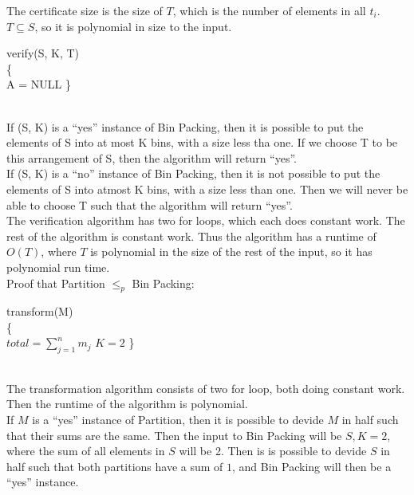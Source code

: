 \documentclass{assignment}
\begin{document}
\begin{problemlist}
\begin{answer}
The certificate size is the size of $T$, which is the number of elements in all $t_i$. $T\subseteq S$, so it is polynomial in size to the input.\\
\IncMargin{3em}
\begin{algorithm}
  verify(S, K, T)\\\{\\
  \Indp
  A = NULL\;
  \;
  \Indm
  \}
\end{algorithm}
\DecMargin{3em}\\
If (S, K) is a ``yes'' instance of Bin Packing, then it is possible to put the elements of S into at most K bins, with a size less tha one. If we choose T to be this arrangement of S, then the algorithm will return ``yes''.\\
If (S, K) is a ``no'' instance of Bin Packing, then it is not possible to put the elements of S into atmost K bins, with a size less than one. Then we will never be able to choose T such that the algorithm will return ``yes''.\\
The verification algorithm has two for loops, which each does constant work. The rest of the algorithm is constant work. Thus the algorithm has a runtime of $O(T)$, where $T$ is polynomial in the size of the rest of the input, so it has polynomial run time.\\
\clearpage
Proof that Partition $\le_p$ Bin Packing:\\
\IncMargin{3em}
\begin{algorithm}
  transform(M)\\\{\\
  \Indp
  $total = \sum_{j=1}^n m_j$\;
  $K=2$\;
  \;
  \Indm
  \}
\end{algorithm}
\DecMargin{3em}\\
The transformation algorithm consists of two for loop, both doing constant work. Then the runtime of the algorithm is polynomial.\\
If $M$ is a ``yes'' instance of Partition, then it is possible to devide $M$ in half such that their sums are the same. Then the input to Bin Packing will be $S, K=2$, where the sum of all elements in $S$ will be 2. Then is is possible to devide $S$ in half such that both partitions have a sum of $1$, and Bin Packing will then be a ``yes'' instance.\\

\end{answer}
\end{problemlist}
\end{document}
